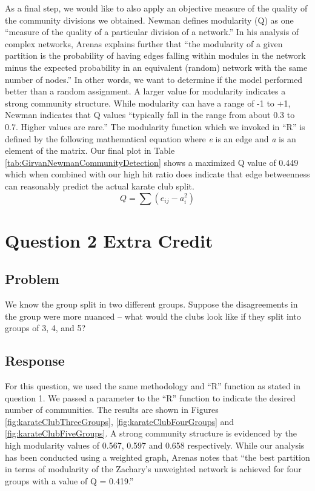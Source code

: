 \documentclass[letterpaper,11pt]{report}
\begin{document}
\begin{savenotes}
As a final step, we would like to also apply an objective measure of the quality of the community divisions we obtained.  Newman \cite{newman2004finding} defines modularity (Q) as one ``measure of the quality of a particular division of a network.'' In his analysis of complex networks, Arenas \cite{arenas2008analysis} explains further that ``the modularity of a given partition is the probability of having edges falling within modules in the network minus the expected probability in an equivalent (random) network with the same number of nodes.'' In other words, we want to determine if the model performed better than a random assignment. A larger value for modularity indicates a strong community structure. While modularity can have a range of -1 to +1, Newman \cite{newman2004finding} indicates that Q values ``typically fall in the range from about 0.3 to 0.7.  Higher values are rare.'' The modularity function which we invoked in ``R'' is defined by the following mathematical equation where \emph{e} is an edge and \emph{a} is an element of the matrix. Our final plot in Table \ref{tab:GirvanNewmanCommunityDetection} shows a maximized Q value of 0.449 which when combined with our high hit ratio does indicate that edge betweenness can reasonably predict the actual karate club split.
\begin{equation}
Q = \sum (e_{ij} - a^{2}_{i}) 
\end{equation}

\section{Question 2 Extra Credit}
\subsection{Problem}We know the group split in two different groups.  Suppose the disagreements in the group were more nuanced -- what would the clubs look like if they split into groups of 3, 4, and 5?
\subsection{Response}For this question, we used the same methodology and ``R'' function as stated in question 1. We passed a parameter to the ``R'' function to indicate the desired number of communities.  The results are shown in Figures \ref{fig:karateClubThreeGroups}, \ref{fig:karateClubFourGroups} and \ref{fig:karateClubFiveGroups}. A strong community structure is evidenced by the high modularity values of 0.567, 0.597 and 0.658 respectively. While our analysis has been conducted using a weighted graph, Arenas \cite{arenas2008analysis} notes that ``the best partition in terms of modularity of the Zachary's unweighted network is achieved for four groups with a value of Q = 0.419.'' 


\end{savenotes}
\end{document}
